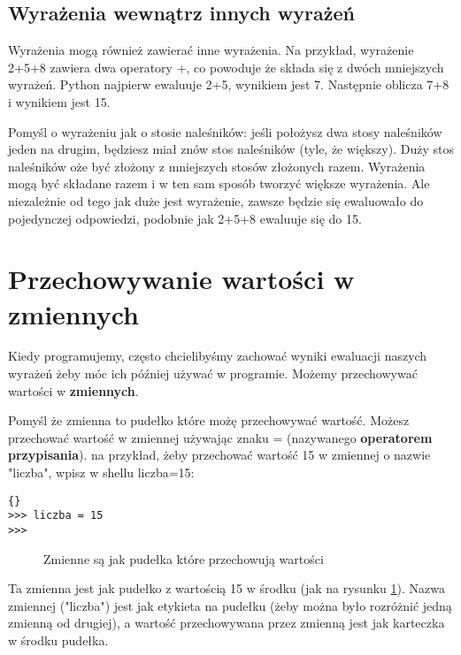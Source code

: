 \documentclass{book}
\begin{document}
\subsection{Wyrażenia wewnątrz innych wyrażeń}

Wyrażenia mogą również zawierać inne wyrażenia. Na przykład, wyrażenie 2+5+8 zawiera dwa operatory +, co powoduje że składa się z dwóch mniejszych wyrażeń. Python najpierw ewaluuje 2+5, wynikiem jest 7. Następnie oblicza 7+8 i wynikiem jest 15.

Pomyśl o wyrażeniu jak o stosie naleśników: jeśli położysz dwa stosy naleśników jeden na drugim, będziesz miał znów stos naleśników (tyle, że większy). Duży stos naleśników oże być złożony z mniejszych stosów złożonych razem. Wyrażenia mogą być składane razem i w ten sam sposób tworzyć większe wyrażenia. Ale niezależnie od tego jak duże jest wyrażenie, zawsze będzie się ewaluowało do pojedynczej odpowiedzi, podobnie jak 2+5+8 ewaluuje się do 15.

\section{Przechowywanie wartości w zmiennych}

Kiedy programujemy, często chcielibyśmy zachować wyniki ewaluacji naszych wyrażeń żeby móc ich później używać w programie. Możemy przechowywać wartości w {\bf zmiennych}.

Pomyśl że zmienna to pudełko które możę przechowywać wartość. Możesz przechować wartość w zmiennej używając znaku = (nazywanego {\bf operatorem przypisania}). na przykład, żeby przechować wartość 15 w zmiennej o nazwie "liczba", wpisz w shellu liczba=15:

\lstset{language=python}
\begin{lstlisting}{}
>>> liczba = 15
>>>
\end{lstlisting}

\begin{figure}
\centerline{
}
\caption{Zmienne są jak pudełka które przechowują wartości}
\label{idle-zmienna}
\end{figure}

Ta zmienna jest jak pudełko z wartością 15 w środku (jak na rysunku \ref{idle-zmienna}). Nazwa zmiennej ("liczba") jest jak etykieta na pudełku (żeby można było rozróżnić jedną zmienną od drugiej), a wartość przechowywana przez zmienną jest jak karteczka w środku pudełka.
\end{document}
